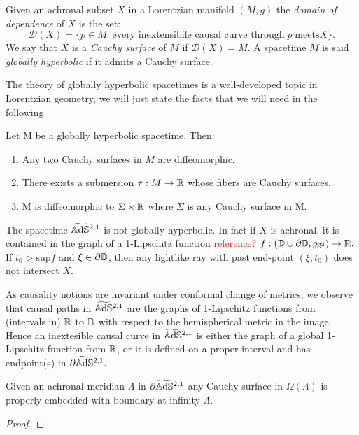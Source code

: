 \begin{definition}
    Given an achronal subset $X$ in a Lorentzian manifold $(M,g)$ the \textit{domain of dependence} of $X$ is the set: 
    \[
        \mathcal{D}(X)=\{p\in M |\;\text{every inextensibile causal curve through}\; p\; \text{meets} X \}.
    \]
    We say that $X$ is a \textit{Cauchy surface} of $M$ if $\mathcal{D}(X)=M$. A spacetime $M$ is said \textit{globally hyperbolic} if it admits a Cauchy surface.
\end{definition}

The theory of globally hyperbolic spacetimes is a well-developed topic in Lorentzian geometry, we will just state the facts that we will need in the following. 

\begin{theorem}
    Let M be a globally hyperbolic spacetime. Then:
    \begin{enumerate}
        \item Any two Cauchy surfaces in $M$ are diffeomorphic. 
        \item There exists a submersion $\tau:M\to\mathbb{R}$ whose fibers are Cauchy surfaces.
        \item M is diffeomorphic to $\Sigma\times\mathbb{R}$ where $\Sigma$ is any Cauchy surface in M.
    \end{enumerate}
\end{theorem}

\begin{observation}
    The spacetime $\widetilde{\mathbb{A}\mathrm{d}\mathbb{S}}{}^{2,1}$ is not globally hyperbolic. In fact if $X$ is achronal, it is contained in the graph of a 1-Lipschitz function \textcolor{red}{reference?} $f:(\mathbb{D}\cup\partial\mathbb{D},g_{\mathbb{S}^2})\to\mathbb{R}.$ If $t_0>\text{sup}f$ and $\xi \in \partial\mathbb{D}$, then any lightlike ray with past end-point $(\xi,t_0)$ does not intersect $X.$ 
\end{observation}

\begin{observation}
    As causality notions are invariant under conformal change of metrics, we observe that causal paths in $\widetilde{\mathbb{A}\mathrm{d}\mathbb{S}}{}^{2,1}$ are the graphs of 1-Lipschitz functions from (intervals in) $\mathbb{R}$ to $\mathbb{D}$ with respect to the hemispherical metric in the image. Hence an inextesible causal curve in $\widetilde{\mathbb{A}\mathrm{d}\mathbb{S}}{}^{2,1}$ is either the graph of a global 1-Lipschitz function from $\mathbb{R}$, or it is defined on a proper interval and has endpoint(s) in $\partial\widetilde{\mathbb{A}\mathrm{d}\mathbb{S}}{}^{2,1}.$
\end{observation}

\begin{lemma}
    Given an achronal meridian $\Lambda$ in $\partial\widetilde{\mathbb{A}\mathrm{d}\mathbb{S}}{}^{2,1}$ any Cauchy surface in $\Omega(\Lambda)$ is properly embedded with boundary at infinity $\Lambda$. 
\end{lemma}
\begin{proof}
    
\end{proof}

